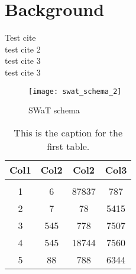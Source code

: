 \chapter{Background}
\label{background}

Test cite \cite{ceccato} \\
test cite 2 \cite{itrust_swat} \\
test cite 3 \cite{itrust_site} \\
test cite 3 \cite{itrust_invariants_paper}\\

\begin{figure}[h]
	\texttt{[image: swat\_schema\_2]}
	\caption{SWaT schema}
	\label{fig:Schema SWaT}
\end{figure}

\begin{table}
	\centering
	\begin{tabular}{||c c c c||} 
		\hline
		Col1 & Col2 & Col2 & Col3 \\ [0.5ex] 
		\hline
		 & & & \\
		1 & 6 & 87837 & 787 \\ 
		2 & 7 & 78 & 5415 \\
		3 & 545 & 778 & 7507 \\
		4 & 545 & 18744 & 7560 \\
		5 & 88 & 788 & 6344 \\ [1ex] 
		\hline
	\end{tabular}
	\caption{This is the caption for the first table.}
	\label{table:1}
\end{table}
